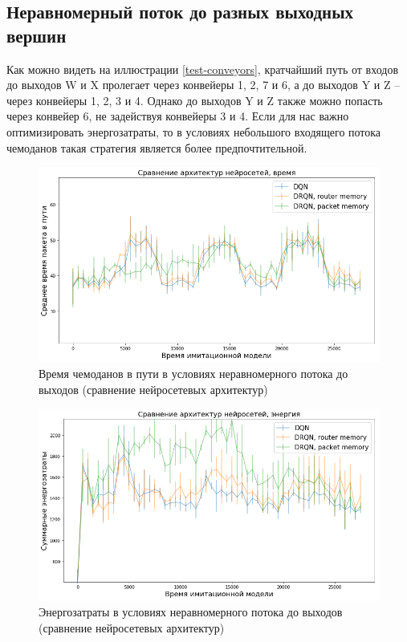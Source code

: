 \documentclass[specification, annotation]{itmo-student-thesis}
\begin{document}
\subsection{Неравномерный поток до разных выходных вершин}\label{experiments:conveyors/altering-flow}

Как можно видеть на иллюстрации \ref{test-conveyors}, кратчайший путь от входов
до выходов W и X пролегает через конвейеры 1, 2, 7 и 6, а до выходов Y и Z --
через конвейеры 1, 2, 3 и 4. Однако до выходов Y и Z также можно попасть через
конвейер 6, не задействуя конвейеры 3 и 4. Если для нас важно оптимизировать
энергозатраты, то в условиях небольшого входящего потока чемоданов такая
стратегия является более предпочтительной.

\begin{figure}[!h]
  \caption{Время чемоданов в пути в условиях неравномерного потока до
    выходов (сравнение нейросетевых архитектур)}\label{experiment-conveyors-en1-time-nns}
  \centering
  \includegraphics[scale=0.6]{experiment-conveyors-en1-time-nns}
\end{figure}

\begin{figure}[!h]
  \caption{Энергозатраты в условиях неравномерного потока до
    выходов (сравнение нейросетевых архитектур)}\label{experiment-conveyors-en1-energy-nns}
  \centering
  \includegraphics[scale=0.6]{experiment-conveyors-en1-energy-nns}
\end{figure}
\end{document}
